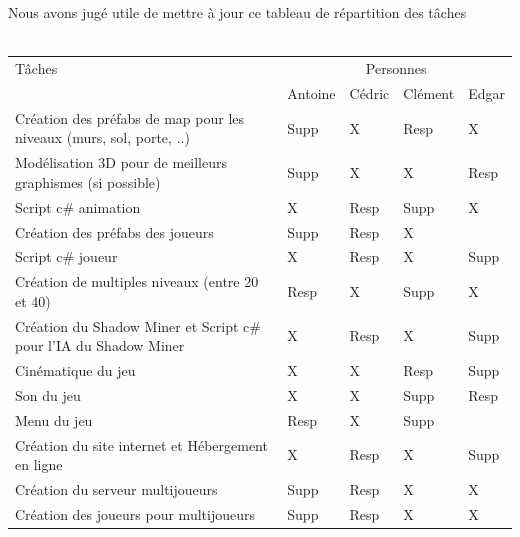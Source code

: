 \documentclass[titlepage, 13px, a4paper]{report}
\begin{document}
\paragraph{} \hspace{0pt} \\ 
Nous avons jugé utile de mettre à jour ce tableau de répartition des tâches
\\ \\
{\normalsize
	\begin{tabular}{|p{6cm}|p{1.2cm}|p{1.2cm}|p{1.2cm}|p{1.2cm}|}
		\hline
		Tâches & \multicolumn{4}{|c|}{Personnes} \\ 
		\cline{2-5}
			& Antoine & Cédric & Clément & Edgar \\
		\hline
		Création des préfabs de map pour les niveaux (murs, sol, porte, ..) & Supp\footnotemark[2] & X & Resp\footnotemark[1] & X \\
		\hline
		Modélisation 3D pour de meilleurs graphismes (si possible) & Supp\footnotemark[2] & X & X & Resp\footnotemark[1] \\
		\hline
		Script c\# animation & X & Resp\footnotemark[1] & Supp\footnotemark[2] & X \\
		\hline
		Création des préfabs des joueurs & Supp\footnotemark[2] & Resp\footnotemark[1] & X &  \\
		\hline
		Script c\# joueur & X & Resp\footnotemark[1] & X & Supp\footnotemark[2] \\
		\hline
		Création de multiples niveaux (entre 20 et 40) & Resp\footnotemark[1] & X & Supp\footnotemark[2] & X \\
		\hline
		Création du Shadow Miner et Script c\# pour l'IA du Shadow Miner & X & Resp\footnotemark[1] & X & Supp\footnotemark[2] \\
		\hline
		Cinématique du jeu & X & X & Resp\footnotemark[1] & Supp\footnotemark[2] \\
		\hline
		Son du jeu & X & X & Supp\footnotemark[2] & Resp\footnotemark[1] \\
		\hline
		Menu du jeu & Resp\footnotemark[1] & X & Supp\footnotemark[2] & \\
		\hline
		Création du site internet et Hébergement en ligne & X & Resp\footnotemark[1] & X & Supp\footnotemark[2] \\
		\hline
		Création du serveur multijoueurs & Supp\footnotemark[2] & Resp\footnotemark[1] & X & X \\
		\hline
		Création des joueurs pour multijoueurs & Supp\footnotemark[2] & Resp\footnotemark[1] & X & X \\

\end{tabular}}
\end{document}
